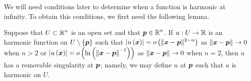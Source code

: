 We will need conditions later to determine when a function is harmonic
at infinity.  To obtain this conditions, we first need the following
lemma.

\begin{lemma} \label{lem_PotInftyU}
Suppose that $\displaystyle U \subset \mathbb{R}^n$ is an open set and that
$\displaystyle {\bm{p}} \in \mathbb{R}^n$.
If $u:U \to \mathbb{R}$ is an harmonic function on $U \setminus \{{\bm{p}}\}$
such that
$\displaystyle \left|u\left({\bm{x}}\right)\right|
= o\left(\|{\bm{x}} - {\bm{p}}\|^{2-n}\right)$ as
$\|{\bm{x}} - {\bm{p}}\| \to 0$ when $n>2$ or
$\displaystyle \left|u\left({\bm{x}}\right)\right|
= o\left(\ln\left(\left\|{\bm{x}} - {\bm{p}}\right\|^{-1}\right)\right)$
as $\|{\bm{x}} - {\bm{p}}\| \to 0$ when $n=2$, then $u$ has a
removable singularity at ${\bm{p}}$; namely, we may define $u$ at
${\bm{p}}$ such that $u$ is harmonic on $U$.
\end{lemma}

